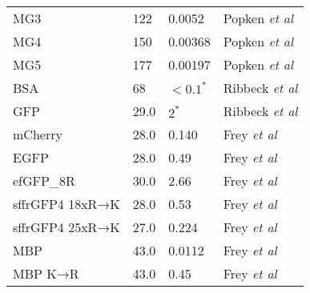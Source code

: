 \documentclass[10pt, a4paper]{article}
\begin{document}
\begin{multicols}{2}
\begin{table}[H]
{\begin{tabular}{p{3cm}|p{1cm}|p{2cm}|p{2.6cm}}
MG3 & 122 & 0.0052 & Popken \textit{et al} \\
MG4 & 150 & 0.00368 & Popken \textit{et al} \\
MG5 & 177 & 0.00197 & Popken \textit{et al} \\
BSA & 68 & $<0.1^{*}$ & Ribbeck \textit{et al} \\
GFP & 29.0 & $2^{*}$ & Ribbeck \textit{et al} \\
mCherry & 28.0 & 0.140 & Frey \textit{et al} \\
EGFP & 28.0 & 0.49 & Frey \textit{et al} \\
efGFP\_8R & 30.0 & 2.66 & Frey \textit{et al} \\
sffrGFP4 18xR→K & 28.0 & 0.53 & Frey \textit{et al} \\
sffrGFP4 25xR→K & 27.0 & 0.224 & Frey \textit{et al} \\
MBP & 43.0 & 0.0112 & Frey \textit{et al} \\
MBP K→R & 43.0 & 0.45 & Frey \textit{et al} \\
\end{tabular}
}
\label{tbl:inert_probes}
\end{table}


\end{multicols}
\end{document}
